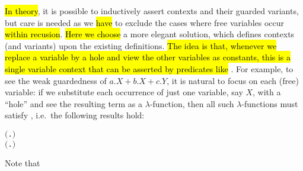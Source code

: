 \hl{In theory}, it is possible to inductively assert \multivariate contexts and their
guarded variants, but care is needed as we \hl{have} to exclude the cases where
free variables occur \hl{within recusion}.  \hl{Here we choose} a more elegant
 solution, which defines \multivariate contexts (and variants) upon the
 existing \univariate definitions.
\hl{The idea is that, whenever we replace a variable by a hole and view
the other variables as constants, this is a single variable context
that can be asserted by predicates like} .
For example, to see the weak guardedness of $a.X + b.X + c.Y$, it is
natural to focus on each (free) variable: if we substitute each
occurrence of just one variable, say $X$, with a ``hole'' and see the
resulting term as a $\lambda$-function, then all such $\lambda$-functions
must satisfy , i.e.~the following results hold:
\begin{alltt}
\HOLTokenTurnstile{}  \ensuremath{(}\HOLTokenLambda{}. \HOLSymConst{\ensuremath{\ldotp}} \HOLSymConst{\ensuremath{+}} \HOLSymConst{\ensuremath{\ldotp}} \HOLSymConst{\ensuremath{+}} \HOLSymConst{\ensuremath{\ldotp}} \ensuremath{)}
\HOLTokenTurnstile{}  \ensuremath{(}\HOLTokenLambda{}. \HOLSymConst{\ensuremath{\ldotp}}  \HOLSymConst{\ensuremath{+}} \HOLSymConst{\ensuremath{\ldotp}}  \HOLSymConst{\ensuremath{+}} \HOLSymConst{\ensuremath{\ldotp}}\ensuremath{)}
\end{alltt}
Note that 
